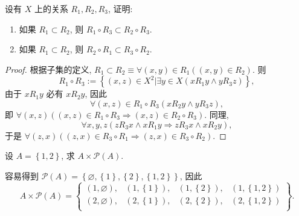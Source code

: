 \documentclass[10pt,UTF8]{book} %
\begin{document}
\begin{exercise}
    设有 $X$ 上的关系 $R_1, R_2, R_3$, 证明:
    \begin{enumerate}[label={${\arabic*}^\circ$}, itemsep=0pt]
        \item 如果 $R_1 \subset R_2$, 则 $R_1 \circ R_3 \subset R_2 \circ R_3$.
        \item 如果 $R_1 \subset R_2$, 则 $R_2 \circ R_1 \subset R_3 \circ R_2$.
    \end{enumerate}
    \begin{proof}
        根据子集的定义, $R_1 \subset R_2 \equiv \forall (x,y) \in R_1 \left(
            (x, y) \in R_2
        \right)$.
        则 \[ R_1 \circ R_3 := \left\{ (x,z) \in X^2 | \exists y \in X \left(
            x R_1 y \wedge y R_3 z
        \right) \right\}, \]
        由于 $x R_1 y$ 必有 $x R_2 y$,
        因此 \[ \forall (x,z) \in R_1 \circ R_3 \left(
            x R_2 y \wedge y R_3 z
        \right), \]
        即 $\forall (x,z) \left( (x,z) \in R_1 \circ R_3 \Rightarrow 
        (x,z) \in R_2 \circ R_3 \right)$.
        同理, \[ \forall x,y,z \left(
            z R_3 x \wedge x R_1 y \Rightarrow z R_3 x \wedge x R_2 y
        \right), \]
        于是 $\forall (z,x) \left( (z,x) \in R_3 \circ R_1 \Rightarrow
        (z,x) \in R_3 \circ R_2 \right)$.
    \end{proof}
\end{exercise}

\begin{exercise}
    设 $A = \left\{ 1,2 \right\}$,
    求 $A \times \mathcal{P}(A)$.
    \begin{sol}
        容易得到 $\mathcal{P}(A) = \left\{
            \varnothing, \left\{1\right\}, \left\{2\right\},
            \left\{1,2\right\}
        \right\}$, 因此
        \[ A \times \mathcal{P}(A) = \left\{
            \begin{matrix}
                (1, \varnothing), & (1, \left\{1\right\}), & (1, \left\{2\right\}), & (1, \left\{1,2\right\}) \\
                (2, \varnothing), & (2, \left\{1\right\}), & (2, \left\{2\right\}), & (2, \left\{1,2\right\}) \\
            \end{matrix}
        \right\}. \]
    \end{sol}
\end{exercise}
\end{document}
